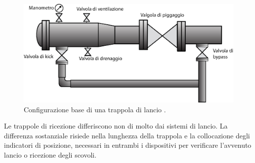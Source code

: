 \begin{figure}[htbp]
	\centering
	\includegraphics[width=.8\textwidth]{fig/pig/launcher.eps}
	\caption{Configurazione base di una trappola di lancio \parencite{davidson2002introduction}.}
	\label{fig:piglauncher}
\end{figure}

Le trappole di ricezione differiscono non di molto dai sistemi di lancio. La differenza sostanziale risiede nella lunghezza della trappola e la collocazione degli indicatori di posizione, necessari in entrambi i dispositivi per verificare l'avvenuto lancio o ricezione degli scovoli.

